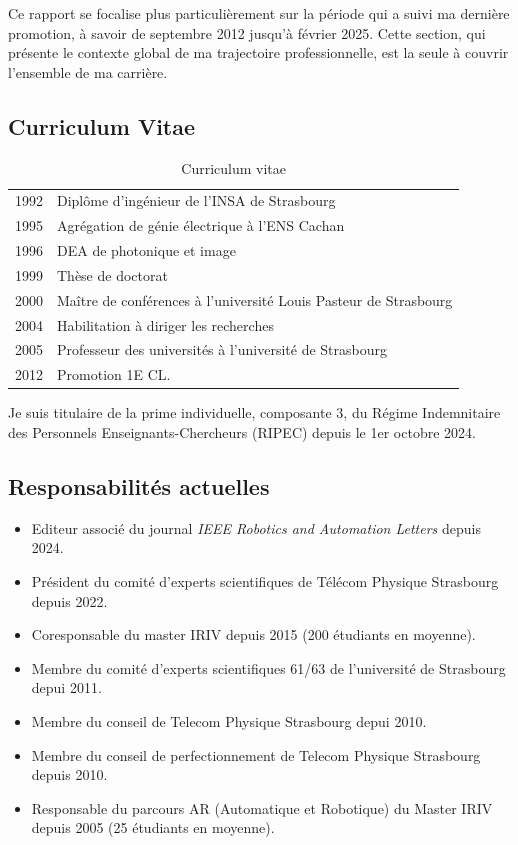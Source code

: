 \documentclass[a4paper,12pt]{article}
\begin{document}
Ce rapport se focalise plus particulièrement sur la période qui a suivi ma dernière promotion, à savoir de septembre 2012 jusqu'à février 2025. Cette section, qui présente le contexte global de ma trajectoire professionnelle, est la seule à couvrir l'ensemble de ma carrière.

\subsection{Curriculum Vitae}

\begin{table}[H]
    \centering
    \begin{tabular}{ll}
    \toprule
        1992	& Diplôme d'ingénieur de l'INSA de Strasbourg\\
        1995	& Agrégation de génie électrique à l'ENS Cachan\\
        1996	& DEA de photonique et image\\
        1999	& Thèse de doctorat\\
        2000	& Maître de conférences à l’université Louis Pasteur de Strasbourg\\
        2004	& Habilitation à diriger les recherches\\
        2005	& Professeur des universités à l’université de Strasbourg\\
        2012    & Promotion 1E CL.\\
    \bottomrule
    \end{tabular}
    \caption{Curriculum vitae}
    \label{tab:CV}
\end{table}

Je suis titulaire de la prime individuelle, composante 3, du Régime Indemnitaire des
Personnels Enseignants-Chercheurs (RIPEC) depuis le 1er octobre 2024.

\subsection{Responsabilités actuelles}

\begin{itemize}
    \item Editeur associé du journal \textit{IEEE Robotics and Automation Letters} depuis 2024.
    \item Président du comité d’experts scientifiques de Télécom Physique Strasbourg depuis 2022.
    \item Coresponsable du master IRIV depuis 2015 (200 étudiants en moyenne).
    \item Membre du comité d’experts scientifiques 61/63 de l’université de Strasbourg depui 2011.
    \item Membre du conseil de Telecom Physique Strasbourg depui 2010.
    \item Membre du conseil de perfectionnement de Telecom Physique Strasbourg depuis 2010.
    \item Responsable du parcours AR (Automatique et Robotique) du Master IRIV depuis 2005 (25 étudiants en moyenne).
\end{itemize}
\end{document}
